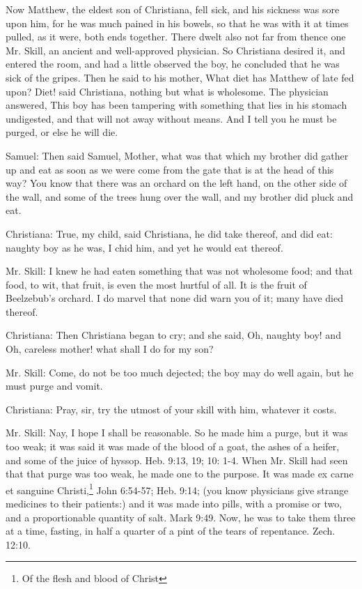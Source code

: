 Now Matthew, the eldest son of Christiana, fell sick, and his sickness was sore upon him, for he was much pained in his bowels, so that he was with it at times pulled, as it were, both ends together. There dwelt also not far from thence one Mr. Skill, an ancient and well-approved physician. So Christiana desired it, and entered the room, and had a little observed the boy, he concluded that he was sick of the gripes. Then he said to his mother, What diet has Matthew of late fed upon? Diet! said Christiana, nothing but what is wholesome. The physician answered, This boy has been tampering with something that lies in his stomach undigested, and that will not away without means. And I tell you he must be purged, or else he will die.

Samuel: Then said Samuel, Mother, what was that which my brother did gather up and eat as soon as we were come from the gate that is at the head of this way? You know that there was an orchard on the left hand, on the other side of the wall, and some of the trees hung over the wall, and my brother did pluck and eat.

Christiana: True, my child, said Christiana, he did take thereof, and did eat: naughty boy as he was, I chid him, and yet he would eat thereof.

Mr. Skill: I knew he had eaten something that was not wholesome food; and that food, to wit, that fruit, is even the most hurtful of all. It is the fruit of Beelzebub's orchard. I do marvel that none did warn you of it; many have died thereof.

Christiana: Then Christiana began to cry; and she said, Oh, naughty boy! and Oh, careless mother! what shall I do for my son?

Mr. Skill: Come, do not be too much dejected; the boy may do well again, but he must purge and vomit.

Christiana: Pray, sir, try the utmost of your skill with him, whatever it costs.

Mr. Skill: Nay, I hope I shall be reasonable. So he made him a purge, but it was too weak; it was said it was made of the blood of a goat, the ashes of a heifer, and some of the juice of hyssop. Heb. 9:13, 19; 10: 1-4. When Mr. Skill had seen that that purge was too weak, he made one to the purpose. It was made ex carne et sanguine Christi,\footnote{Of the flesh and blood of Christ} John 6:54-57; Heb. 9:14; (you know physicians give strange medicines to their patients:) and it was made into pills, with a promise or two, and a proportionable quantity of salt. Mark 9:49. Now, he was to take them three at a time, fasting, in half a quarter of a pint of the tears of repentance. Zech. 12:10.

